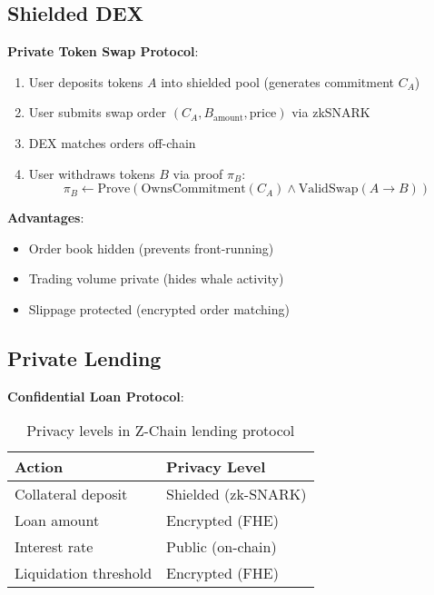 \documentclass[11pt]{article}
\begin{document}
\subsection{Shielded DEX}

\textbf{Private Token Swap Protocol}:

\begin{enumerate}
  \item User deposits tokens $A$ into shielded pool (generates commitment $C_A$)
  \item User submits swap order $(C_A, B_{\text{amount}}, \text{price})$ via zkSNARK
  \item DEX matches orders off-chain
  \item User withdraws tokens $B$ via proof $\pi_B$:
  \begin{equation}
    \pi_B \leftarrow \text{Prove}\left(\text{OwnsCommitment}(C_A) \land \text{ValidSwap}(A \to B)\right)
  \end{equation}
\end{enumerate}

\textbf{Advantages}:
\begin{itemize}[leftmargin=1.1em]
  \item Order book hidden (prevents front-running)
  \item Trading volume private (hides whale activity)
  \item Slippage protected (encrypted order matching)
\end{itemize}

\subsection{Private Lending}

\textbf{Confidential Loan Protocol}:

\begin{table}[h]
\centering
\begin{tabular}{ll}
\toprule
Action & Privacy Level \\
\midrule
Collateral deposit & Shielded (zk-SNARK) \\
Loan amount & Encrypted (FHE) \\
Interest rate & Public (on-chain) \\
Liquidation threshold & Encrypted (FHE) \\
\bottomrule
\end{tabular}
\caption{Privacy levels in Z-Chain lending protocol}
\end{table}
\end{document}
